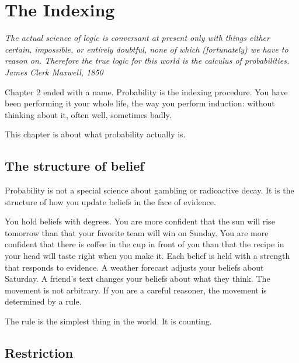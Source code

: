 \chapter{The Indexing}

\vspace{1em}
\hfill
\begin{minipage}[c]{0.55\textwidth}
\raggedleft
\small\itshape
The actual science of logic is conversant at present only with things either certain, impossible, or entirely doubtful, none of which (fortunately) we have to reason on. Therefore the true logic for this world is the calculus of probabilities.\\[0.5em]
\upshape\footnotesize James Clerk Maxwell, 1850
\end{minipage}%
\hspace{0.5em}
\begin{minipage}[c]{0.12\textwidth}
\end{minipage}
\vspace{1.5em}

\noindent Chapter 2 ended with a name. Probability is the indexing procedure. You have been performing it your whole life, the way you perform induction: without thinking about it, often well, sometimes badly.

This chapter is about what probability actually is.

\section*{The structure of belief}

Probability is not a special science about gambling or radioactive decay. It is the structure of how you update beliefs in the face of evidence.

You hold beliefs with degrees. You are more confident that the sun will rise tomorrow than that your favorite team will win on Sunday. You are more confident that there is coffee in the cup in front of you than that the recipe in your head will taste right when you make it. Each belief is held with a strength that responds to evidence. A weather forecast adjusts your beliefs about Saturday. A friend's text changes your beliefs about what they think. The movement is not arbitrary. If you are a careful reasoner, the movement is determined by a rule.

The rule is the simplest thing in the world. It is counting.

\section*{Restriction}

